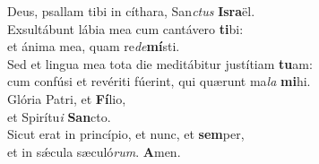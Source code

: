 \evenverse Deus, psallam tibi in cíthara, San\textit{ctus} \textbf{Is}\textbf{ra}ël.\\
\oddverse Exsultábunt lábia mea cum cantávero \textbf{ti}bi:~\*\\
\oddverse et ánima mea, quam re\textit{de}\textbf{mí}sti.\\
\evenverse Sed et lingua mea tota die meditábitur justítiam \textbf{tu}am:~\*\\
\evenverse cum confúsi et revériti fúerint, qui quærunt ma\textit{la} \textbf{mi}hi.\\
\oddverse Glória Patri, et \textbf{Fí}lio,~\*\\
\oddverse et Spirítu\textit{i} \textbf{San}cto.\\
\evenverse Sicut erat in princípio, et nunc, et \textbf{sem}per,~\*\\
\evenverse et in sǽcula sæculó\textit{rum}. \textbf{A}men.\\
